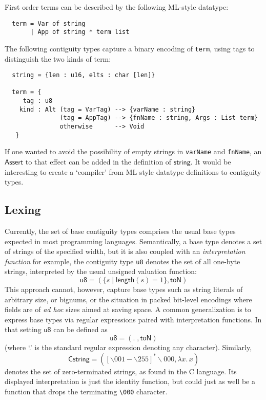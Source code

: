 \documentclass[a4paper,UKenglish,cleveref, autoref, thm-restate]{lipics-v2021}
\newcommand{\konst}[1]{\ensuremath{\mathsf{#1}}}
\newcommand{\set}[1]{\ensuremath{\{ {#1} \}}}
\begin{document}
\begin{example}

First order terms can be described by the following ML-style datatype:

{\small
\begin{verbatim}
  term = Var of string
       | App of string * term list
\end{verbatim}}

\noindent The following contiguity types capture a binary encoding of
\verb+term+, using tags to distinguish the two kinds of term:

{\small
\begin{verbatim}
  string = {len : u16, elts : char [len]}

  term = {
     tag : u8
    kind : Alt (tag = VarTag) --> {varName : string}
               (tag = AppTag) --> {fnName : string, Args : List term}
               otherwise      --> Void
   }
\end{verbatim}}

If one wanted to avoid the possibility of empty strings in
\verb+varName+ and \verb+fnName+, an \konst{Assert} to that effect can
be added in the definition of \konst{string}. It would be interesting
to create a `compiler' from ML style datatype definitions to
contiguity types.
\end{example}

\subsection{Lexing}

Currently, the set of base contiguity types comprises the usual base
types expected in most programming languages. Semantically, a base
type denotes a set of strings of the specified width, but it is also
coupled with an \emph{interpretation function} for example, the
contiguity type \verb+u8+ denotes the set of all one-byte strings,
interpreted by the usual unsigned valuation function:
%
\[ \konst{u8} = (\set{s \mid \konst{length}(s) = 1}, \konst{toN} )
\]
%
This approach cannot, however, capture base types such as string
literals of arbitrary size, or bignums, or the situation in packed
bit-level encodings where fields are of \emph{ad hoc} sizes aimed at
saving space. A common generalization is to express base types via
regular expressions paired with interpretation functions. In that
setting \konst{u8} can be defined as
%
\[ \konst{u8} = ( . \; , \konst{toN})
\]
%
(where `.' is the standard regular expression denoting any character). Similarly,
%
\[ \konst{Cstring} = ([\backslash 001-\backslash 255]^{*}\backslash 000, \lambda x.\,x )
\]
%
denotes the set of zero-terminated strings, as found in the C
language. Its displayed interpretation is just the identity function,
but could just as well be a function that drops the terminating
\verb+\000+ character.
\end{document}
